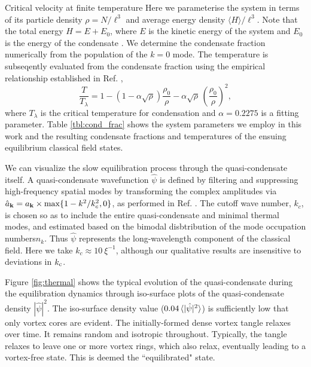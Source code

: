 \begin{chapter}{\label{cha:nonequib}Critical velocity at finite temperature}
Here we parameterise the system in terms of its particle density $\rho = N/\ell^3$ and average energy density $\langle H \rangle/\ell^3$.  Note that the total energy $H=E+E_0$, where $E$ is the kinetic energy of the system and $E_0$ is the energy of the condensate \cite{PhysRevLett.95.263901}.  We determine the condensate fraction numerically from the population of the $k=0$ mode.  The temperature is subseqently evaluated from the condensate fraction using the empirical relationship established in Ref. \cite{berloff_2007},
\begin{equation}
  \frac{T}{T_\lambda} = 1 - (1 - \alpha\sqrt{\rho})\frac{\rho_0}{\rho} - \alpha\sqrt{\rho}\,\left(\frac{\rho_0}{\rho}\right)^2,
  \label{eq:temp}
\end{equation}
where $T_{\lambda}$ is the critical temperature for condensation and $\alpha=0.2275$ is a fitting parameter.   Table \ref{tbl:cond_frac} shows the system parameters we employ in this work and the resulting condensate fractions and temperatures of the ensuing equilibrium classical field states.  

We can visualize the slow equilibration process through the quasi-condensate itself.  A quasi-condensate wavefunction $\hat{\psi}$ is defined by filtering and suppressing high-frequency spatial modes by transforming the complex amplitudes via $\hat{a}_{{\bf k}} = a_{{\bf k}}\times\max\{1-k^{2}/k_c^2,0\}$, as performed in Ref. \cite{PhysRevA.66.013603}.  The cutoff wave number, $k_c$, is chosen so as to include the entire quasi-condensate and minimal thermal modes, and estimated based on the bimodal disbtribution of the mode occupation numbers$n_k$.  Thus $\hat{\psi}$ represents the long-wavelength component of the classical field.  Here we take $k_c \approx 10~ \xi^{-1}$, although our qualitative results are insensitive to deviations in $k_{\rm c}$.  

Figure \ref{fig:thermal} shows the typical evolution of the quasi-condensate during the equilibration dynamics through iso-surface plots of the quasi-condensate density $|\hat{\psi}|^2$.  The iso-surface density value ($0.04\braket{|\hat{\psi}|^2}$) is sufficiently low that only vortex cores are evident.   The initially-formed dense vortex tangle relaxes over time.  It remains random and isotropic throughout.  Typically, the tangle relaxes to leave one or more vortex rings, which also relax, eventually leading to a vortex-free state.   This is deemed the ``equilibrated" state.    


\end{chapter}
